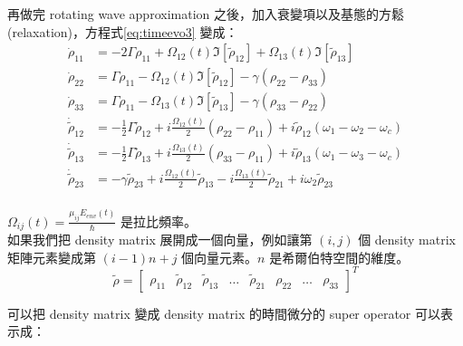 \documentclass[11pt,a4paper]{article}
\begin{document}
再做完 rotating wave approximation 之後，加入衰變項以及基態的方鬆(relaxation)，方程式\ref{eq:timeevo3} 變成：\\

\begin{align}
\label{eq:timeevo3}
\dot{\rho}_{11} &= -2\Gamma \rho_{11} + \Omega_{12}(t)\Im \left[ \tilde{\rho}_{12} \right]+\Omega_{13}(t)\Im \left[ \tilde{\rho}_{13} \right]\nonumber\\
\dot{\rho}_{22} &= \Gamma \rho_{11} -\Omega_{12}(t)\Im \left[ \tilde{\rho}_{12} \right] - \gamma \left( \rho_{22} - \rho_{33} \right)\nonumber\\
\dot{\rho}_{33} &= \Gamma \rho_{11} -\Omega_{13}(t)\Im \left[ \tilde{\rho}_{13} \right] - \gamma \left( \rho_{33} - \rho_{22} \right)\nonumber\\
\dot{\tilde{\rho}}_{12} &= -\frac{1}{2}\Gamma\tilde{\rho}_{12} +i \frac{\Omega_{12}(t)}{2}\left( \rho_{22} - \rho_{11} \right) + i \tilde{\rho}_{12} \left( \omega_1 - \omega_2 -\omega_c \right) \nonumber\\
\dot{\tilde{\rho}}_{13} &= -\frac{1}{2}\Gamma\tilde{\rho}_{13} +i \frac{\Omega_{13}(t)}{2} \left( \rho_{33} - \rho_{11} \right) + i \tilde{\rho}_{13} \left( \omega_1 - \omega_3 -\omega_c \right)\nonumber\\
\dot{\tilde{\rho}}_{23} &= -\gamma\tilde{\rho}_{23} + i \frac{\Omega_{12}(t)}{2}\tilde{\rho}_{13} -i \frac{\Omega_{13}(t)}{2}\tilde{\rho}_{21}+i\omega_2 \tilde{\rho}_{23}\nonumber\\
\end{align}

$\Omega_{ij}(t) = \frac{\mu_{ij}E_{env}(t)}{\hbar}$ 是拉比頻率。\\

如果我們把 density matrix 展開成一個向量，例如讓第 $(i,j)$ 個 density matrix 矩陣元素變成第 $(i-1)n+j$ 個向量元素。$n$ 是希爾伯特空間的維度。\\

\begin{equation}
\tilde{\rho} =
\begin{bmatrix}
\rho_{11}&
\tilde{\rho}_{12}&
\tilde{\rho}_{13}&
\hdots&
\tilde{\rho}_{21}&
\rho_{22}&
\hdots&
\rho_{33}
\end{bmatrix}^{T}
\end{equation}

可以把 density matrix 變成 density matrix 的時間微分的 super operator 可以表示成：\\
\end{document}
